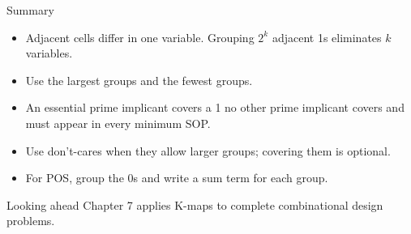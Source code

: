 \documentclass[9pt,aspectratio=169,xcolor=table]{beamer}
\begin{document}
\begin{frame}{Summary}
  \begin{itemize}\itemsep3pt\small
    \item Adjacent cells differ in one variable. Grouping $2^k$ adjacent 1s eliminates $k$ variables.
    \item Use the \alert{largest} groups and the \alert{fewest} groups.
    \item An \alert{essential prime implicant} covers a 1 no other prime implicant covers and must appear in every minimum SOP.
    \item Use \alert{don't-cares} when they allow larger groups; covering them is optional.
    \item For POS, group the 0s and write a sum term for each group.
  \end{itemize}
  \begin{block}{Looking ahead}
    Chapter 7 applies K-maps to complete combinational design problems.
  \end{block}
\end{frame}
\end{document}
